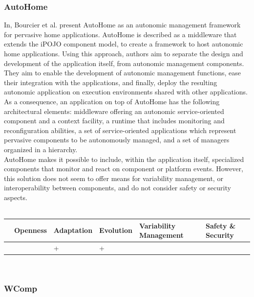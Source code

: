 \subsubsection{AutoHome}

In\cite{Bourcier:2011}, Bourcier et al. present AutoHome as an autonomic management framework for pervasive home applications. AutoHome is described as a middleware that extends the iPOJO component model, to create a framework to host autonomic home applications. Using this approach, authors aim to separate the design and development of the application itself, from autonomic management components. They aim to enable the development of autonomic management functions, ease their integration with the applications, and finally, deploy the resulting autonomic application on execution environments shared with other applications. As a consequence, an application on top of AutoHome has the following architectural elements: middleware offering an autonomic service-oriented component and a context facility, a runtime that includes monitoring and reconfiguration abilities, a set of service-oriented applications which represent pervasive components to be autonomously managed, and a set of managers organized in a hierarchy.\\

AutoHome makes it possible to include, within the application itself, specialized components that monitor and react on component or platform events.
However, this solution does not seem to offer means for variability management, or interoperability between components, and do not consider safety or security aspects.\\
 \\
\begin{tabular}{ >{\centering}m{}| >{\centering}m{} >{\centering}m{}| >{\centering}m{} >{\centering}m{}| >{\centering\arraybackslash}m{}}
{\tiny Interoperability} & {\tiny Openness} & {\tiny Adaptation} & {\tiny Evolution} & {\tiny Variability Management} & {\tiny Safety \& Security}\\
 \hline
  &  & + & + &  & \\ 
  \hline
\end{tabular}\\


\subsubsection{WComp}

